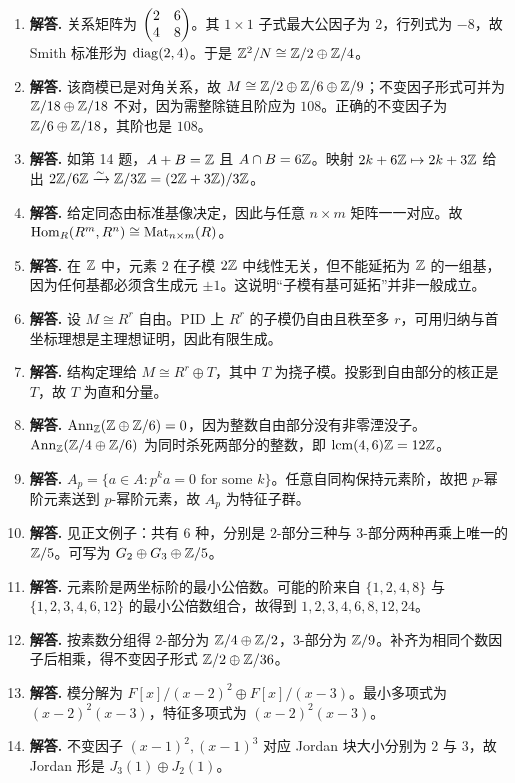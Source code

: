 \begin{enumerate}[label=\textbf{\arabic*.}, leftmargin=*, itemsep=1em]
\item \textbf{解答.} 关系矩阵为 $\begin{pmatrix} 2&6\\4&8 \end{pmatrix}$。其 $1\times1$ 子式最大公因子为 $2$，行列式为 $-8$，故 Smith 标准形为 $\mathrm{diag}(2,4)$。于是 $\mathbb{Z}^2/N\cong \mathbb{Z}/2\oplus \mathbb{Z}/4$。
\item \textbf{解答.} 该商模已是对角关系，故 $M\cong \mathbb{Z}/2\oplus \mathbb{Z}/6\oplus \mathbb{Z}/9$；不变因子形式可并为 $\mathbb{Z}/18\oplus \mathbb{Z}/18$ 不对，因为需整除链且阶应为 $108$。正确的不变因子为 $\mathbb{Z}/6\oplus \mathbb{Z}/18$，其阶也是 $108$。
\item \textbf{解答.} 如第 14 题，$A+B=\mathbb{Z}$ 且 $A\cap B=6\mathbb{Z}$。映射 $2k+6\mathbb{Z}\mapsto 2k+3\mathbb{Z}$ 给出 $2\mathbb{Z}/6\mathbb{Z}\xrightarrow{\sim} \mathbb{Z}/3\mathbb{Z}=(2\mathbb{Z}+3\mathbb{Z})/3\mathbb{Z}$。
\item \textbf{解答.} 给定同态由标准基像决定，因此与任意 $n\times m$ 矩阵一一对应。故 $\mathrm{Hom}_R(R^m,R^n)\cong \mathrm{Mat}_{n\times m}(R)$。
\item \textbf{解答.} 在 $\mathbb{Z}$ 中，元素 $2$ 在子模 $2\mathbb{Z}$ 中线性无关，但不能延拓为 $\mathbb{Z}$ 的一组基，因为任何基都必须含生成元 $\pm1$。这说明“子模有基可延拓”并非一般成立。
\item \textbf{解答.} 设 $M\cong R^r$ 自由。PID 上 $R^r$ 的子模仍自由且秩至多 $r$，可用归纳与首坐标理想是主理想证明，因此有限生成。
\item \textbf{解答.} 结构定理给 $M\cong R^r\oplus T$，其中 $T$ 为挠子模。投影到自由部分的核正是 $T$，故 $T$ 为直和分量。
\item \textbf{解答.} $\mathrm{Ann}_{\mathbb{Z}}(\mathbb{Z}\oplus \mathbb{Z}/6)=0$，因为整数自由部分没有非零湮没子。$\mathrm{Ann}_{\mathbb{Z}}(\mathbb{Z}/4\oplus \mathbb{Z}/6)$ 为同时杀死两部分的整数，即 $\operatorname{lcm}(4,6)\mathbb{Z}=12\mathbb{Z}$。
\item \textbf{解答.} $A_p=\{a\in A:p^ka=0\text{ for some }k\}$。任意自同构保持元素阶，故把 $p$-幂阶元素送到 $p$-幂阶元素，故 $A_p$ 为特征子群。
\item \textbf{解答.} 见正文例子：共有 $6$ 种，分别是 $2$-部分三种与 $3$-部分两种再乘上唯一的 $\mathbb{Z}/5$。可写为 $G_2\oplus G_3\oplus \mathbb{Z}/5$。
\item \textbf{解答.} 元素阶是两坐标阶的最小公倍数。可能的阶来自 $\{1,2,4,8\}$ 与 $\{1,2,3,4,6,12\}$ 的最小公倍数组合，故得到 $1,2,3,4,6,8,12,24$。
\item \textbf{解答.} 按素数分组得 $2$-部分为 $\mathbb{Z}/4\oplus \mathbb{Z}/2$，$3$-部分为 $\mathbb{Z}/9$。补齐为相同个数因子后相乘，得不变因子形式 $\mathbb{Z}/2\oplus \mathbb{Z}/36$。
\item \textbf{解答.} 模分解为 $F[x]/(x-2)^2\oplus F[x]/(x-3)$。最小多项式为 $(x-2)^2(x-3)$，特征多项式为 $(x-2)^2(x-3)$。
\item \textbf{解答.} 不变因子 $(x-1)^2,(x-1)^3$ 对应 Jordan 块大小分别为 $2$ 与 $3$，故 Jordan 形是 $J_3(1)\oplus J_2(1)$。

\end{enumerate}
